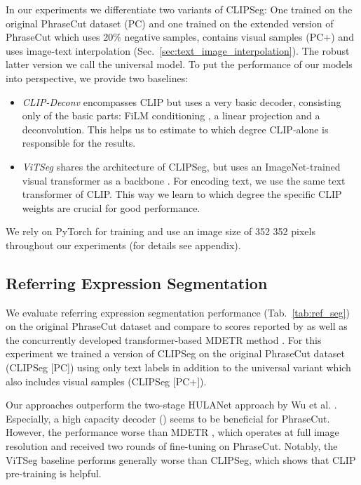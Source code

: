 \documentclass[10pt,twocolumn,letterpaper]{article}
\begin{document}
In our experiments we differentiate two variants of CLIPSeg: One trained on the original PhraseCut dataset (PC) and one trained on the extended version of PhraseCut which uses 20\% negative samples, contains visual samples (PC+) and uses image-text interpolation (Sec.~\ref{sec:text_image_interpolation}). The robust latter version we call the universal model. To put the performance of our models into perspective, we provide two baselines:
\begin{itemize}
\setlength\itemsep{0em}
    \item \emph{CLIP-Deconv} encompasses CLIP but uses a very basic decoder, consisting only of the basic parts: FiLM conditioning \cite{dumoulin18}, a linear projection and a deconvolution. This helps us to estimate to which degree CLIP-alone is responsible for the results.
    \item \emph{ViTSeg} shares the architecture of CLIPSeg, but uses an ImageNet-trained visual transformer as a backbone \cite{timm}. For encoding text, we use the same text transformer of CLIP. This way we learn to which degree the specific CLIP weights are crucial for good performance.
\end{itemize}
We rely on PyTorch \cite{pytorch} for training and use an image size of 352  352 pixels throughout our experiments (for details see appendix).



\subsection{Referring Expression Segmentation}
We evaluate referring expression segmentation performance (Tab.~\ref{tab:ref_seg}) on the original PhraseCut dataset and compare to scores reported by \citet{wu20phrasecut} as well as the concurrently developed transformer-based MDETR method \cite{kamath21}. 
For this experiment we trained a version of CLIPSeg on the original PhraseCut dataset (CLIPSeg [PC]) using only text labels in addition to the universal variant which also includes visual samples (CLIPSeg [PC+]).

Our approaches outperform the two-stage HULANet approach by Wu et al. \cite{wu20phrasecut}. Especially, a high capacity decoder () seems to be beneficial for PhraseCut. However, the performance worse than MDETR \cite{kamath21}, which operates at full image resolution and received two rounds of fine-tuning on PhraseCut. 
Notably, the ViTSeg baseline performs generally worse than CLIPSeg, which shows that CLIP pre-training is helpful.
\end{document}
